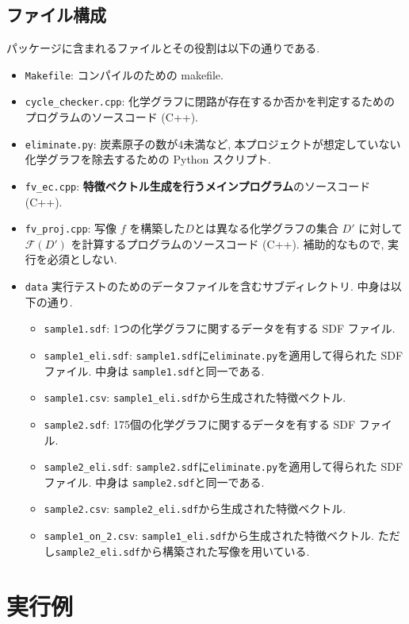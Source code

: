 \documentclass[11pt, titlepage, dvipdfmx, twoside]{jarticle}
\begin{document}
\subsection{ファイル構成}
パッケージに含まれるファイルとその役割は以下の通りである. 
\begin{itemize}
\item {\tt Makefile}: コンパイルのための makefile. 
\item {\tt cycle\_checker.cpp}: 化学グラフに閉路が存在するか否かを判定するためのプログラムのソースコード (C++).  
\item {\tt eliminate.py}: 炭素原子の数が4未満など, 本プロジェクトが想定していない化学グラフを除去するための Python スクリプト. 
\item {\tt fv\_ec.cpp}: {\bf 特徴ベクトル生成を行うメインプログラム}のソースコード (C++). 
\item {\tt fv\_proj.cpp}: 写像 $f$ を構築した$D$とは異なる化学グラフの集合 $D'$
  に対して ${\mathcal F}(D')$ を計算するプログラムのソースコード (C++).
  補助的なもので, 実行を必須としない. 
\item {\tt data} 実行テストのためのデータファイルを含むサブディレクトリ. 中身は以下の通り.
  \begin{itemize}
  \item {\tt sample1.sdf}: 1つの化学グラフに関するデータを有する SDF ファイル. 
  \item {\tt sample1\_eli.sdf}: {\tt sample1.sdf}に{\tt eliminate.py}を適用して得られた SDF ファイル. 中身は {\tt sample1.sdf}と同一である. 
  \item {\tt sample1.csv}: {\tt sample1\_eli.sdf}から生成された特徴ベクトル. 
  \item {\tt sample2.sdf}: 175個の化学グラフに関するデータを有する SDF ファイル. 
  \item {\tt sample2\_eli.sdf}: {\tt sample2.sdf}に{\tt eliminate.py}を適用して得られた SDF ファイル. 中身は {\tt sample2.sdf}と同一である. 
  \item {\tt sample2.csv}: {\tt sample2\_eli.sdf}から生成された特徴ベクトル. 
  \item {\tt sample1\_on\_2.csv}: {\tt sample1\_eli.sdf}から生成された特徴ベクトル. 
    ただし{\tt sample2\_eli.sdf}から構築された写像を用いている. 
  \end{itemize}
\end{itemize}

\clearpage
\section{実行例}
\label{sec:quick}
\end{document}
